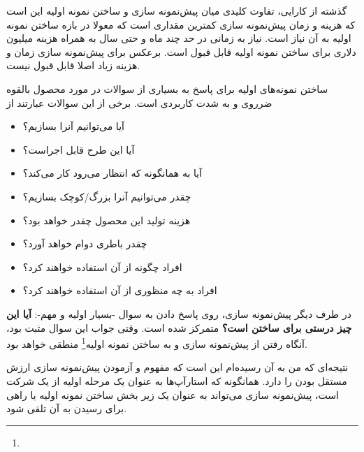 گذشته از کارایی، تفاوت کلیدی میان پیش‌نمونه سازی و ساختن نمونه اولیه این
است که هزینه و زمان پیش‌نمونه سازی کمترین مقداری است که معولا در بازه
ساختن نمونه اولیه به آن نیاز است. نیاز به زمانی در حد چند ماه و حتی سال
به همراه هزینه میلیون دلاری برای ساختن نمونه اولیه قابل قبول است. برعکس
برای پیش‌نمونه سازی زمان و هزینه زیاد اصلا قابل قبول نیست.

ساختن نمونه‌های اولیه برای پاسخ به بسیاری از سوالات در مورد محصول بالقوه
ضرروی و به شدت کاربردی است. برخی از این سوالات عبارتند از

\begin{itemize}

\item
  آیا می‌توانیم آنرا بسازیم؟
\item
  آیا این طرح قابل اجراست؟
\item
  آیا به همانگونه که انتظار می‌رود کار می‌کند؟
\item
  چقدر می‌توانیم آنرا بزرگ/کوچک بسازیم؟
\item
  هزینه تولید این محصول چقدر خواهد بود؟
\item
  چقدر باطری دوام خواهد آورد؟
\item
  افراد چگونه از آن استفاده خواهند کرد؟
\item
  افراد به چه منظوری از آن استفاده خواهند کرد؟
\end{itemize}

در طرف دیگر پیش‌نمونه سازی، روی پاسخ دادن به سوال -بسیار اولیه و مهم-:
\textbf{آیا این چیز درستی برای ساختن است؟} متمرکز شده است. وقتی جواب این
سوال مثبت بود، آنگاه رفتن از پیش‌نمونه سازی و به ساختن نمونه
اولیه\footnote{} منطقی خواهد بود.

نتیجه‌ای که من به آن رسیده‌ام این است که مفهوم و آزمودن پیش‌نمونه سازی
ارزش مستقل بودن را دارد. همانگونه که استارآپ‌ها به عنوان یک مرحله اولیه
از یک شرکت است، پیش‌نمونه سازی می‌تواند به عنوان یک زیر بخش ساختن نمونه
اولیه یا راهی برای رسیدن به آن تلقی شود.
